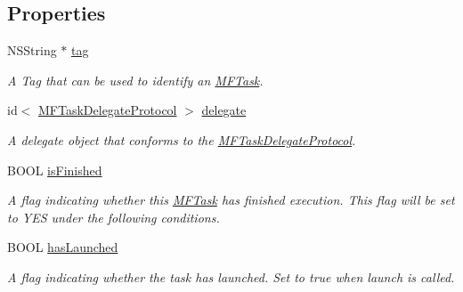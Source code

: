 \subsection*{Properties}
\begin{CompactItemize}
\item 
\hypertarget{interface_m_f_task_46cba33c9438dec37b7c1129bf348961}{
NSString $\ast$ \hyperlink{interface_m_f_task_46cba33c9438dec37b7c1129bf348961}{tag}}
\label{interface_m_f_task_46cba33c9438dec37b7c1129bf348961}

\begin{CompactList}\small\item\em A Tag that can be used to identify an \hyperlink{interface_m_f_task}{MFTask}. \item\end{CompactList}\item 
\hypertarget{interface_m_f_task_97ec64fcca5f2bd98f881866382a4987}{
id$<$ \hyperlink{protocol_m_f_task_delegate_protocol-p}{MFTaskDelegateProtocol} $>$ \hyperlink{interface_m_f_task_97ec64fcca5f2bd98f881866382a4987}{delegate}}
\label{interface_m_f_task_97ec64fcca5f2bd98f881866382a4987}

\begin{CompactList}\small\item\em A delegate object that conforms to the \hyperlink{protocol_m_f_task_delegate_protocol-p}{MFTaskDelegateProtocol}. \item\end{CompactList}\item 
BOOL \hyperlink{interface_m_f_task_ff8a9424833ed515702b622592f6869f}{isFinished}
\begin{CompactList}\small\item\em A flag indicating whether this \hyperlink{interface_m_f_task}{MFTask} has finished execution. This flag will be set to YES under the following conditions. \item\end{CompactList}\item 
\hypertarget{interface_m_f_task_a6e4a857c39aaaaf63603cf0291277e0}{
BOOL \hyperlink{interface_m_f_task_a6e4a857c39aaaaf63603cf0291277e0}{hasLaunched}}
\label{interface_m_f_task_a6e4a857c39aaaaf63603cf0291277e0}

\begin{CompactList}\small\item\em A flag indicating whether the task has launched. Set to true when launch is called. \item\end{CompactList}\end{CompactItemize}


